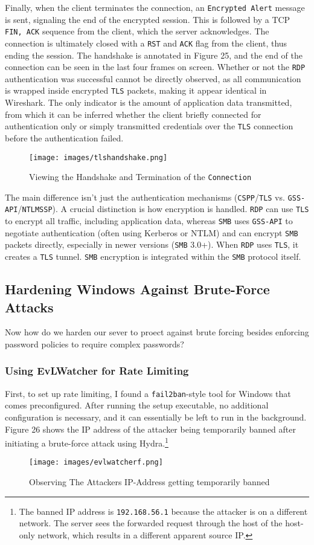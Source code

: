\documentclass[a4paper]{article}
\newcommand{\abc}{\hfill \break}
\begin{document}
Finally, when the client terminates the connection, an \texttt{Encrypted Alert} message is sent, signaling the end of the encrypted session. This is followed by a TCP \texttt{FIN, ACK} sequence from the client, which the server acknowledges. The connection is ultimately closed with a \texttt{RST} and \texttt{ACK} flag from the client, thus ending the session. The handshake is annotated in Figure 25, and the end of the connection can be seen in the last four frames on screen.\cite{tls-encryped-alert, noauthor_what_nodate} \abc
Whether or not the \texttt{RDP} authentication was successful cannot be directly observed, as all communication is wrapped inside encrypted \texttt{TLS} packets, making it appear identical in Wireshark. The only indicator is the amount of application data transmitted, from which it can be inferred whether the client briefly connected for authentication only or simply transmitted credentials over the \texttt{TLS} connection before the authentication failed.
\begin{figure}[h]
	\texttt{[image: images/tlshandshake.png]}
	\centering
	\caption{Viewing the Handshake and Termination of the \texttt{Connection}}
\end{figure}\abc
The main difference isn't just the authentication mechanisms (\texttt{CSPP}/\texttt{TLS} vs. \texttt{GSS-API}/\texttt{NTLMSSP}). A crucial distinction is how encryption is handled. \texttt{RDP} can use \texttt{TLS} to encrypt all traffic, including application data, whereas \texttt{SMB} uses \texttt{GSS-API} to negotiate authentication (often using Kerberos or NTLM) and can encrypt \texttt{SMB} packets directly, especially in newer versions (\texttt{SMB} 3.0+). When \texttt{RDP} uses \texttt{TLS}, it creates a \texttt{TLS} tunnel. \texttt{SMB} encryption is integrated within the \texttt{SMB} protocol itself. \cite{microsoft_corporation_server_2024, noauthor_remote_2024}\newpage
\subsection{Hardening Windows Against Brute-Force Attacks}
Now how do we harden our sever to proect against brute forcing besides enforcing password policies to require complex passwords?
\subsubsection{Using EvLWatcher for Rate Limiting}
First, to set up rate limiting, I found a \texttt{fail2ban}-style tool for Windows that comes preconfigured. After running the setup executable, no additional configuration is necessary, and it can essentially be left to run in the background. Figure 26 shows the IP address of the attacker being temporarily banned after initiating a brute-force attack using Hydra.\footnote{The banned IP address is \texttt{192.168.56.1} because the attacker is on a different network. The server sees the forwarded request through the host of the host-only network, which results in a different apparent source IP.}\cite{noauthor_devnullievlwatcher_nodate}
\begin{figure}[h]
	\texttt{[image: images/evlwatcherf.png]}
	\centering
	\caption{Observing The Attackers IP-Address getting temporarily banned}
\end{figure}\abc
\end{document}
